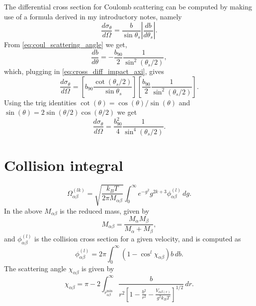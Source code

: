 \documentclass[a4paper,11pt]{report}
\begin{document}
The differential cross section for Coulomb scattering can be computed by making use of a formula derived in my introductory notes, namely
\begin{equation}
    \label{eq:cross_diff_impact_axi}
    \frac{d\sigma_\theta}{d\Omega} = \frac{b}{\sin \theta_s} \left | \frac{db}{d\theta_s} \right |.
\end{equation}
From \cref{eq:coul_scattering_angle} we get,
\begin{equation}
    \frac{db}{d\theta} = -\frac{b_{90}}{2} \frac{1}{\sin^2 (\theta_s / 2)},
\end{equation}
which, plugging in \cref{eq:cross_diff_impact_axi}, gives
\begin{equation*}
    \frac{d\sigma_\theta}{d\Omega} = \left [ b_{90}\frac{\cot(\theta_s/2)}{\sin \theta_s} \right ] \left [ \frac{b_{90}}{2} \frac{1}{\sin^2 (\theta_s / 2)} \right ].
\end{equation*}
Using the trig identities $\cot(\theta) = \cos(\theta) / \sin(\theta)$ and $\sin(\theta) = 2 \sin(\theta/2) \cos(\theta/2)$ we get
\begin{equation}
    \frac{d\sigma_\theta}{d\Omega} = \frac{b_{90}^2}{4} \frac{1}{\sin^4 (\theta_s/2)}.
\end{equation}

\section{Collision integral}
\begin{equation}
    \Omega_{\alpha \beta}^{(lk)} = \sqrt{ \frac{k_B T}{2 \pi M_{\alpha \beta}} } \int_0^\infty e^{-g^2} g^{2k+3} \phi_{\alpha \beta}^{(l)} \, dg.
\end{equation}
In the above $M_{\alpha \beta}$ is the reduced mass, given by
\begin{equation}
    M_{\alpha \beta} = \frac{M_\alpha M_\beta}{M_\alpha + M_\beta},
\end{equation}
and $\phi^{(l)}_{\alpha \beta}$ is the collision cross section for a given velocity, and is computed as
\begin{equation}
    \phi_{\alpha \beta}^{(l)} = 2 \pi \int_0^\infty \left ( 1 - \cos^l \chi_{\alpha \beta} \right ) b \, db.
\end{equation}
The scattering angle $\chi_{\alpha \beta}$ is given by
\begin{equation}
    \chi_{\alpha \beta} = \pi - 2 \int_{r_{\alpha \beta}^{\text{min}}}^\infty \frac{b}{r^2 \left [ 1 - \frac{b^2}{r^2} - \frac{V_{\alpha \beta (r)}}{g^2 k_B T} \right ]^{1/2} } \, dr.
\end{equation}
\end{document}
